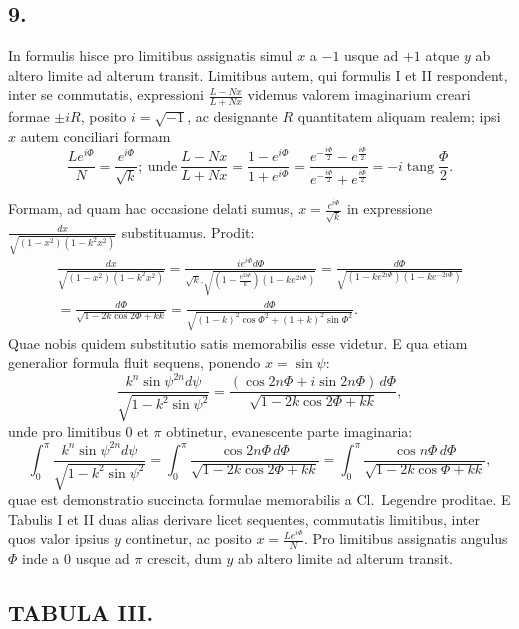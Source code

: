 \documentclass{article}
\begin{document}

\subsection*{9.}

In formulis hisce pro limitibus assignatis simul $x$ a $-1$ usque ad $+1$ atque $y$ ab altero limite ad alterum transit. Limitibus autem, qui formulis I et II respondent, inter se commutatis, expressioni $\frac{L-Nx}{L+Nx}$ videmus valorem imaginarium creari formae $\pm iR$, posito $i=\sqrt{-1}$, ac designante $R$ quantitatem aliquam realem; ipsi $x$ autem conciliari formam
\[
\frac{Le^{i\Phi}}{N}=\frac{e^{i\Phi}}{\sqrt{k}};\ \text{unde}\ \frac{L-Nx}{L+Nx}=\frac{1-e^{i\Phi}}{1+e^{i\Phi}}=\frac{e^{-\frac{i\Phi}{2}}-e^{\frac{i\Phi}{2}}}{e^{-\frac{i\Phi}{2}}+e^{\frac{i\Phi}{2}}}=-i\operatorname{tang}\frac{\Phi}{2}.
\]

Formam, ad quam hac occasione delati sumus, $x=\frac{e^{i\Phi}}{\sqrt{k}}$ in expressione $\frac{dx}{\sqrt{(1-x^{2})(1-k^{2}x^{2})}}$ substituamus. Prodit:
\[
\begin{gathered}
\frac{dx}{\sqrt{(1-x^{2})(1-k^{2}x^{2})}}=\frac{i e^{i\Phi}d\Phi}{\sqrt{k}.\sqrt{\left(1-\frac{e^{2i\Phi}}{k}\right)\left(1-ke^{2i\Phi}\right)}}=\frac{d\Phi}{\sqrt{\left(1-ke^{2i\Phi}\right)\left(1-ke^{-2i\Phi}\right)}}\\
=\frac{d\Phi}{\sqrt{1-2k\cos2\Phi+kk}}=\frac{d\Phi}{\sqrt{(1-k)^{2}\cos\Phi^{2}+(1+k)^{2}\sin\Phi^{2}}}.
\end{gathered}
\]
Quae nobis quidem substitutio satis memorabilis esse videtur. E qua etiam generalior formula fluit sequens, ponendo $x=\sin\psi$:
\[
\frac{k^{n}\sin\psi^{2n}d\psi}{\sqrt{1-k^{2}\sin\psi^{2}}}=\frac{(\cos2n\Phi+i\sin2n\Phi)\,d\Phi}{\sqrt{1-2k\cos2\Phi+kk}},
\]
unde pro limitibus $0$ et $\pi$ obtinetur, evanescente parte imaginaria:
\[
\int_{0}^{\pi}\frac{k^{n}\sin\psi^{2n}d\psi}{\sqrt{1-k^{2}\sin\psi^{2}}}=\int_{0}^{\pi}\frac{\cos2n\Phi\,d\Phi}{\sqrt{1-2k\cos2\Phi+kk}}=\int_{0}^{\pi}\frac{\cos n\Phi\,d\Phi}{\sqrt{1-2k\cos\Phi+kk}},
\]
quae est demonstratio succincta formulae memorabilis a Cl.\ Legendre proditae. E Tabulis I et II duas alias derivare licet sequentes, commutatis limitibus, inter quos valor ipsius $y$ continetur, ac posito $x=\frac{Le^{i\Phi}}{N}$. Pro limitibus assignatis angulus $\Phi$ inde a $0$ usque ad $\pi$ crescit, dum $y$ ab altero limite ad alterum transit.


\subsection*{TABULA III.}
\end{document}
